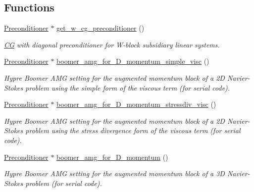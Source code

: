 \subsection*{Functions}
\begin{DoxyCompactItemize}
\item 
\hyperlink{classoomph_1_1Preconditioner}{Preconditioner} $\ast$ \hyperlink{namespaceoomph_1_1Lagrange__Enforced__Flow__Preconditioner__Subsidiary__Operator__Helper_a41dfc7aee7967142be9f4cba3f34a055}{get\+\_\+w\+\_\+cg\+\_\+preconditioner} ()
\begin{DoxyCompactList}\small\item\em \hyperlink{classoomph_1_1CG}{CG} with diagonal preconditioner for W-\/block subsidiary linear systems. \end{DoxyCompactList}\item 
\hyperlink{classoomph_1_1Preconditioner}{Preconditioner} $\ast$ \hyperlink{namespaceoomph_1_1Lagrange__Enforced__Flow__Preconditioner__Subsidiary__Operator__Helper_aeb0ebb2dda2361258334a18d279ade4f}{boomer\+\_\+amg\+\_\+for\+\_\+D\+\_\+momentum\+\_\+simple\+\_\+visc} ()
\begin{DoxyCompactList}\small\item\em Hypre Boomer A\+MG setting for the augmented momentum block of a 2D Navier-\/\+Stokes problem using the simple form of the viscous term (for serial code). \end{DoxyCompactList}\item 
\hyperlink{classoomph_1_1Preconditioner}{Preconditioner} $\ast$ \hyperlink{namespaceoomph_1_1Lagrange__Enforced__Flow__Preconditioner__Subsidiary__Operator__Helper_a349a343a6d474527ffbbf77bebbb453a}{boomer\+\_\+amg\+\_\+for\+\_\+D\+\_\+momentum\+\_\+stressdiv\+\_\+visc} ()
\begin{DoxyCompactList}\small\item\em Hypre Boomer A\+MG setting for the augmented momentum block of a 2D Navier-\/\+Stokes problem using the stress divergence form of the viscous term (for serial code). \end{DoxyCompactList}\item 
\hyperlink{classoomph_1_1Preconditioner}{Preconditioner} $\ast$ \hyperlink{namespaceoomph_1_1Lagrange__Enforced__Flow__Preconditioner__Subsidiary__Operator__Helper_a3e3a8f1508491e564908310d6eb07a2d}{boomer\+\_\+amg\+\_\+for\+\_\+D\+\_\+momentum} ()
\begin{DoxyCompactList}\small\item\em Hypre Boomer A\+MG setting for the augmented momentum block of a 3D Navier-\/\+Stokes problem (for serial code). \end{DoxyCompactList}\item 

\end{DoxyCompactItemize}
